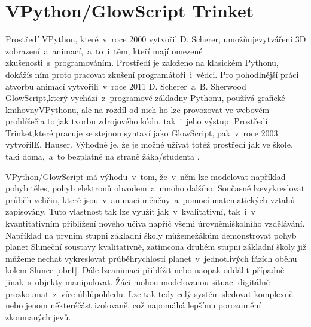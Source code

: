 \documentclass[FM,BP]{tulthesis}
\begin{document}
\chapter{VPython/GlowScript Trinket}
Prostředí VPython, které~v~roce 2000 vytvořil D. Scherer, umožňujevytváření 3D zobrazení~a~animací,~a~to~i~těm, kteří mají omezené zkušenosti~s~programováním. Prostředí je založeno na klasickém Pythonu, dokážís ním proto pracovat zkušení programátoři~i~vědci. Pro pohodlnější práci atvorbu animací vytvořili~v~roce 2011 D. Scherer~a~B. Sherwood GlowScript,který vychází~z~programové základny Pythonu, používá grafické knihovnyVPythonu, ale na rozdíl od nich ho lze provozovat ve webovém prohlížečia to jak tvorbu zdrojového kódu, tak~i~jeho výstup. Prostředí Trinket,které pracuje se stejnou syntaxí jako GlowScript, pak~v~roce 2003 vytvořilE. Hauser. Výhodné je, že je možné užívat totéž prostředí jak ve škole, taki doma,~a~to bezplatně na straně žáka/studenta \cite{c:4,c:5,c:6}.

VPython/GlowScript má výhodu~v~tom, že~v~něm lze modelovat například pohyb těles, pohyb elektronů obvodem~a~mnoho dalšího. Současně lzevykreslovat průběh veličin, které jsou~v~animaci měněny~a~pomocí matematických vztahů zapisovány. Tuto vlastnost tak lze využít jak~v~kvalitativní, tak~i~v kvantitativním přiblížení nového učiva napříč všemi úrovněmiškolního vzdělávání. Například na prvním stupni základní školy můžemežákům demonstrovat pohyb planet Sluneční soustavy kvalitativně, zatímcona druhém stupni základní školy již můžeme nechat vykreslovat průběhrychlosti planet~v~jednotlivých fázích oběhu kolem Slunce \ref{obr1}. Dále lzeanimaci přiblížit nebo naopak oddálit případně jinak~s~objekty manipulovat. Žáci mohou modelovanou situaci digitálně prozkoumat~z~více úhlůpohledu. Lze tak tedy celý systém sledovat komplexně nebo jenom některéčást izolovaně, což napomáhá lepšímu porozumění zkoumaných jevů.
\end{document}
